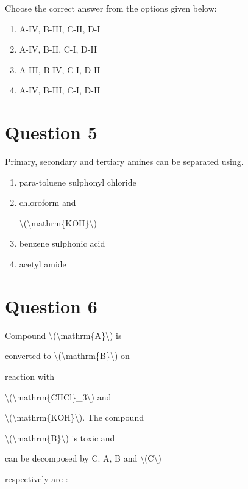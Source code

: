 \documentclass{article}
\begin{document}
Choose the correct answer from the options given below:\\


\begin{enumerate}[label=(\alph*)]
\item A-IV, B-III, C-II, D-I


\item A-IV, B-II, C-I, D-II


\item A-III, B-IV, C-I, D-II


\item A-IV, B-III, C-I, D-II


\end{enumerate}
\newpage
\section*{Question 5}
Primary, secondary and tertiary amines can be separated using.


\begin{enumerate}[label=(\alph*)]
\item para-toluene sulphonyl chloride


\item chloroform and

\textbackslash(\textbackslash mathrm\{KOH\}\textbackslash)


\item benzene sulphonic acid


\item acetyl amide


\end{enumerate}
\newpage
\section*{Question 6}
Compound \textbackslash(\textbackslash mathrm\{A\}\textbackslash) is

converted to \textbackslash(\textbackslash mathrm\{B\}\textbackslash) on

reaction with

\textbackslash(\textbackslash mathrm\{CHCl\}\_3\textbackslash) and

\textbackslash(\textbackslash mathrm\{KOH\}\textbackslash). The compound

\textbackslash(\textbackslash mathrm\{B\}\textbackslash) is toxic and

can be decomposed by C. A, B and \textbackslash(C\textbackslash)

respectively are :
\end{document}
